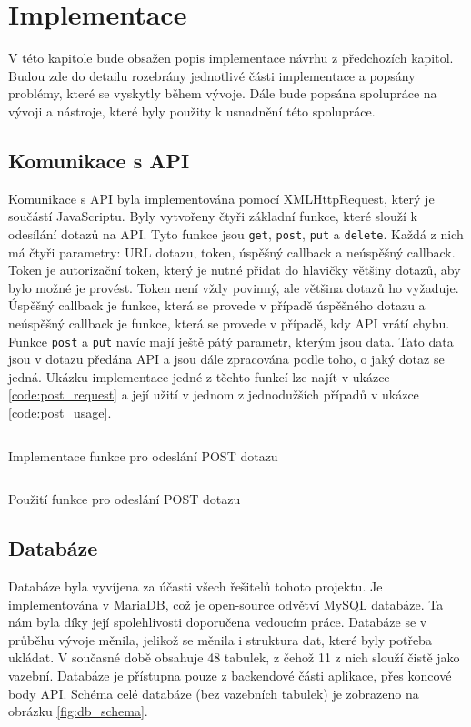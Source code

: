 \chapter{Implementace}
V této kapitole bude obsažen popis implementace návrhu z předchozích kapitol. Budou zde do detailu rozebrány jednotlivé části implementace a popsány problémy, které se vyskytly během vývoje. Dále bude popsána spolupráce na vývoji a nástroje, které byly použity k usnadnění této spolupráce.

\section{Komunikace s API}
Komunikace s API byla implementována pomocí XMLHttpRequest, který je součástí JavaScriptu. Byly vytvořeny čtyři základní funkce, které slouží k odesílání dotazů na API. Tyto funkce jsou \texttt{get}, \texttt{post}, \texttt{put} a \texttt{delete}. Každá z nich má čtyři parametry: URL dotazu, token, úspěšný callback a neúspěšný callback. Token je autorizační token, který je nutné přidat do hlavičky většiny dotazů, aby bylo možné je provést. Token není vždy povinný, ale většina dotazů ho vyžaduje. Úspěšný callback je funkce, která se provede v případě úspěšného dotazu a neúspěšný callback je funkce, která se provede v případě, kdy API vrátí chybu. Funkce \texttt{post} a \texttt{put} navíc mají ještě pátý parametr, kterým jsou data. Tato data jsou v dotazu předána API a jsou dále zpracována podle toho, o jaký dotaz se jedná. Ukázku implementace jedné z těchto funkcí lze najít v ukázce \ref{code:post_request} a její užití v jednom z jednodužších případů v ukázce \ref{code:post_usage}.

\begin{listing}[H]
  \inputminted[breaklines]{typescript}{resources/code/post_request.ts}
  \caption{Implementace funkce pro odeslání POST dotazu}
  \label{code:post_request}
\end{listing}

\begin{listing}[H]
  \inputminted[breaklines]{typescript}{resources/code/post_usage.ts}
  \caption{Použití funkce pro odeslání POST dotazu}
  \label{code:post_usage}
\end{listing}

\section{Databáze}
Databáze byla vyvíjena za účasti všech řešitelů tohoto projektu. Je implementována v MariaDB, což je open-source odvětví MySQL databáze. Ta nám byla díky její spolehlivosti doporučena vedoucím práce. Databáze se v průběhu vývoje měnila, jelikož se měnila i struktura dat, které byly potřeba ukládat. V současné době obsahuje 48 tabulek, z čehož 11 z nich slouží čistě jako vazební. Databáze je přístupna pouze z backendové části aplikace, přes koncové body API. Schéma celé databáze (bez vazebních tabulek) je zobrazeno na obrázku \ref{fig:db_schema}.

